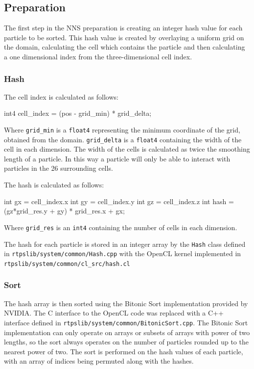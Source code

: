 \subsection{Preparation}
The first step in the NNS preparation is creating an integer hash value for
each particle to be sorted. This hash value is created by overlaying a uniform
grid on the domain, calculating the cell which contains the particle and then
calculating a one dimensional index from the three-dimensional cell index.\cite{Krog2010}

\subsubsection{Hash}
The cell index is calculated as follows:
\begin{cppcode}{0}
int4 cell_index = (pos - grid_min) * grid_delta;
\end{cppcode}

Where \verb|grid_min| is a \verb|float4| representing the minimum coordinate of
the grid, obtained from the domain. \verb|grid_delta| is a \verb|float4|
containing the width of the cell in each dimension. The width of the cells is
calculated as twice the smoothing length of a particle. In this way a particle
will only be able to interact with particles in the 26 surrounding cells.


The hash is calculated as follows:
\begin{cppcode}{0}
int gx = cell_index.x
int gy = cell_index.y
int gz = cell_index.z
int hash = (gz*grid_res.y + gy) * grid_res.x + gx;
\end{cppcode}

Where \verb|grid_res| is an \verb|int4| containing the number of cells in each dimension.


The hash for each particle is stored in an integer array by the \verb|Hash|
class defined in \verb|rtpslib/system/common/Hash.cpp| with the OpenCL kernel
implemented in \\ \verb|rtpslib/system/common/cl_src/hash.cl|

\subsubsection{Sort}
The hash array is then sorted using the Bitonic Sort implementation provided by
NVIDIA\cite{NVBitonic}. The C interface to the OpenCL code was replaced with a
C++ interface defined in \verb|rtpslib/system/common/BitonicSort.cpp|. The
Bitonic Sort implementation can only operate on arrays or subsets of arrays
with power of two lengths, so the sort always operates on the number of
particles rounded up to the nearest power of two. The sort is performed on the
hash values of each particle, with an array of indices being permuted along
with the hashes.

